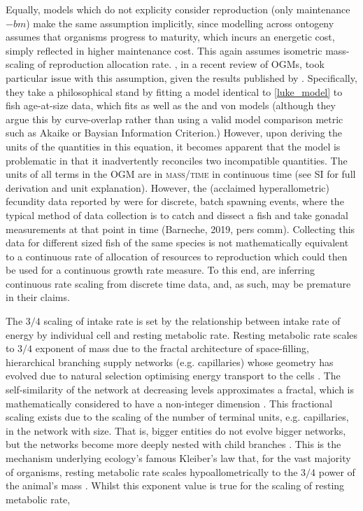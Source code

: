 \documentclass[a4paper]{article} %
\begin{document}
Equally, models which do not explicity consider reproduction (only maintenance $-bm$) make the same assumption implicitly, since modelling across ontogeny assumes that organisms progress to maturity, which incurs an energetic cost, simply reflected in higher maintenance cost. This again assumes isometric mass-scaling of reproduction allocation rate. \cite{Marshall2019b}, in a recent review of OGMs, took particular issue with this assumption, given the results published by \cite{Barneche2018d}. Specifically, they take a philosophical stand by fitting a model identical to \cref{luke_model} to fish age-at-size data, which fits as well as the \cite{West2001} and von \cite{vonBert1938} models (although they argue this by curve-overlap rather than using a valid model comparison metric such as Akaike or Baysian Information Criterion.) However, upon deriving the units of the quantities in this equation, it becomes apparent that the \cite{Marshall2019b} model is problematic in that it inadvertently reconciles two incompatible quantities. The units of all terms in the OGM are in \textsc{mass/time} in continuous time (see SI for full derivation and unit explanation). However, the (acclaimed hyperallometric) fecundity data reported by \cite{Barneche2018d} were for discrete, batch spawning events, where the typical method of data collection is to catch and dissect a fish and take gonadal measurements at that point in time (Barneche, 2019, pers comm). Collecting this data for different sized fish of the same species is not mathematically equivalent to a continuous rate of allocation of resources to reproduction which could then be used for a continuous growth rate measure. To this end, \cite{Marshall2019b} are inferring continuous rate scaling from discrete time data, and, as such, may be premature in their claims.    

The $3/4$ scaling of intake rate is set by the relationship between intake rate of energy by individual cell and resting metabolic rate. Resting metabolic rate scales to $3/4$ exponent of mass due to the fractal architecture of space-filling, hierarchical branching supply networks (e.g. capillaries) whose geometry has evolved due to natural selection optimising energy transport to the cells \autocite{West1997, West2005}. The self-similarity of the network at decreasing levels approximates a fractal, which is mathematically considered to have a non-integer dimension \autocite{Hausdorff1918, Mandelbrot1982}. This fractional scaling exists due to the scaling of the number of terminal units, e.g. capillaries, in the network with size. That is, bigger entities do not evolve bigger networks, but the networks become more deeply nested with child branches \autocite{West1997}. This is the mechanism underlying ecology's famous Kleiber's law that, for the vast majority of organisms, resting metabolic rate scales hypoallometrically to the $3/4$ power of the animal's mass \autocite{Kleiber1947, peters1983, niklas1994plant}. Whilst this exponent value is true for the scaling of resting metabolic rate, 
\end{document}
